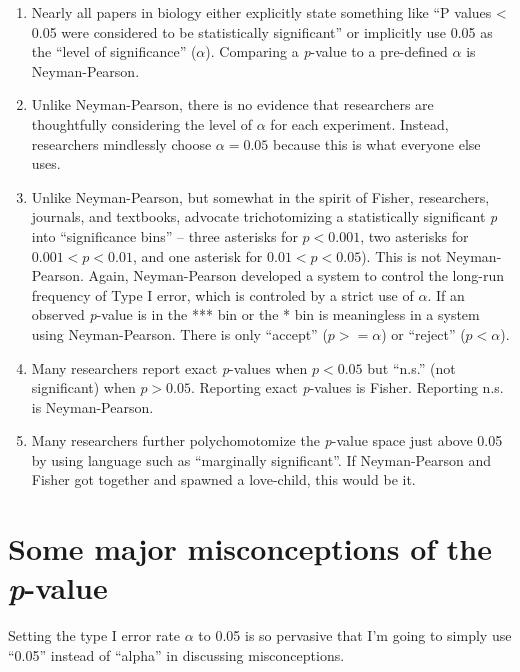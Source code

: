 \documentclass[]{book}
\providecommand{\tightlist}{%
  \setlength{\itemsep}{0pt}\setlength{\parskip}{0pt}}
\begin{document}
\begin{enumerate}
\def\labelenumi{\arabic{enumi}.}
\tightlist
\item
  Nearly all papers in biology either explicitly state something like ``P values \textless{} 0.05 were considered to be statistically significant'' or implicitly use 0.05 as the ``level of significance'' (\(\alpha\)). Comparing a \emph{p}-value to a pre-defined \(\alpha\) is Neyman-Pearson.
\item
  Unlike Neyman-Pearson, there is no evidence that researchers are thoughtfully considering the level of \(\alpha\) for each experiment. Instead, researchers mindlessly choose \(\alpha=0.05\) because this is what everyone else uses.
\item
  Unlike Neyman-Pearson, but somewhat in the spirit of Fisher, researchers, journals, and textbooks, advocate trichotomizing a statistically significant \emph{p} into ``significance bins'' -- three asterisks for \(p < 0.001\), two asterisks for \(0.001 < p < 0.01\), and one asterisk for \(0.01 < p < 0.05\)). This is not Neyman-Pearson. Again, Neyman-Pearson developed a system to control the long-run frequency of Type I error, which is controled by a strict use of \(\alpha\). If an observed \emph{p}-value is in the *** bin or the * bin is meaningless in a system using Neyman-Pearson. There is only ``accept'' (\(p >= \alpha\)) or ``reject'' (\(p < \alpha\)).
\item
  Many researchers report exact \emph{p}-values when \(p < 0.05\) but ``n.s.'' (not significant) when \(p > 0.05\). Reporting exact \emph{p}-values is Fisher. Reporting n.s. is Neyman-Pearson.
\item
  Many researchers further polychomotomize the \emph{p}-value space just above 0.05 by using language such as ``marginally significant''. If Neyman-Pearson and Fisher got together and spawned a love-child, this would be it.
\end{enumerate}

\hypertarget{some-major-misconceptions-of-the-p-value}{%
\section{\texorpdfstring{Some major misconceptions of the \emph{p}-value}{Some major misconceptions of the p-value}}\label{some-major-misconceptions-of-the-p-value}}

Setting the type I error rate \(\alpha\) to 0.05 is so pervasive that I'm going to simply use ``0.05'' instead of ``alpha'' in discussing misconceptions.
\end{document}
